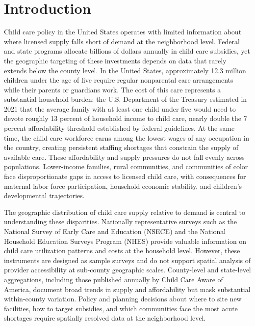 \documentclass{CUP-JNL-DAP}%
\begin{document}
\section{Introduction}

Child care policy in the United States operates with limited information about where licensed supply falls short of demand at the neighborhood level. Federal and state programs allocate billions of dollars annually in child care subsidies, yet the geographic targeting of these investments depends on data that rarely extends below the county level\citep{flood2022}. In the United States, approximately 12.3 million children under the age of five require regular nonparental care arrangements while their parents or guardians work\citep{laughlin2013}. The cost of this care represents a substantial household burden: the U.S. Department of the Treasury estimated in 2021 that the average family with at least one child under five would need to devote roughly 13 percent of household income to child care, nearly double the 7 percent affordability threshold established by federal guidelines\citep{treasury2021}. At the same time, the child care workforce earns among the lowest wages of any occupation in the country, creating persistent staffing shortages that constrain the supply of available care\citep{herbst2023}. These affordability and supply pressures do not fall evenly across populations. Lower-income families, rural communities, and communities of color face disproportionate gaps in access to licensed child care, with consequences for maternal labor force participation, household economic stability, and children's developmental trajectories\citep{morrissey2017,nasem2018}.

The geographic distribution of child care supply relative to demand is central to understanding these disparities. Nationally representative surveys such as the National Survey of Early Care and Education (NSECE) and the National Household Education Surveys Program (NHES) provide valuable information on child care utilization patterns and costs at the household level\citep{nsece2012,yanez2019}. However, these instruments are designed as sample surveys and do not support spatial analysis of provider accessibility at sub-county geographic scales. County-level and state-level aggregations, including those published annually by Child Care Aware of America, document broad trends in supply and affordability but mask substantial within-county variation\citep{ccaa2019}. Policy and planning decisions about where to site new facilities, how to target subsidies, and which communities face the most acute shortages require spatially resolved data at the neighborhood level\citep{flood2022}.
\end{document}

